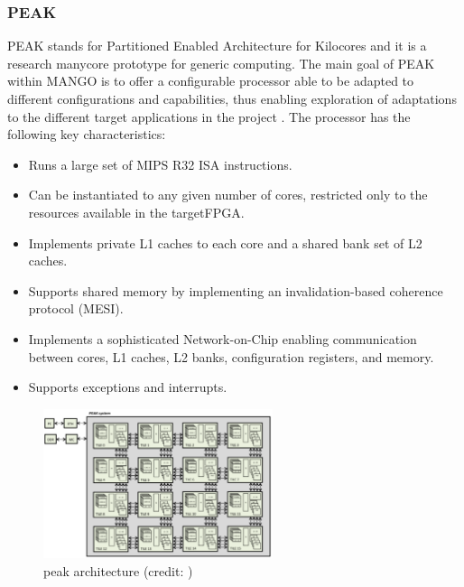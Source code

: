 \subsubsection{PEAK}

PEAK stands for Partitioned Enabled Architecture for Kilocores and it is a research manycore prototype for generic computing. The main goal of PEAK within MANGO is to offer a conﬁgurable processor able to be adapted to different conﬁgurations and capabilities, thus enabling exploration of adaptations to the different target applications in the project \cite{exploring_manycore_architectures_through_the_mango_approach}.
The processor has the following key characteristics:

\begin{itemize}
    \item Runs a large set of MIPS R32 ISA instructions.
    \item Can be instantiated to any given number of cores, restricted only to the resources available in the targetFPGA.
    \item Implements private L1 caches to each core and a shared bank set of L2 caches.
    \item Supports shared memory by implementing an invalidation-based coherence protocol (MESI).
    \item Implements a sophisticated Network-on-Chip enabling communication between cores, L1 caches, L2 banks, conﬁguration registers, and memory.
    \item Supports exceptions and interrupts.
\end{itemize}

\begin{figure}[ht]
    \centering
    \includegraphics[width=0.6\textwidth]{img/peak.png}
    \captionsetup{justification=centering}
    \caption{peak architecture (credit: \cite{exploring_manycore_architectures_through_the_mango_approach})}
    \label{fig:peak}
\end{figure}

